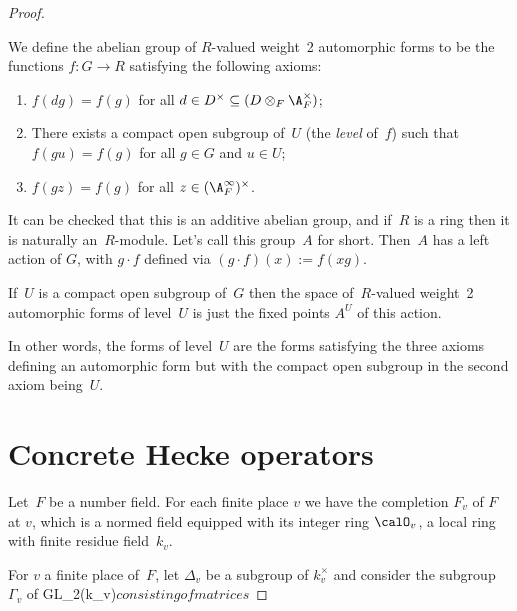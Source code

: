 \begin{proof}
\begin{definition}
  \label{TotallyDefiniteQuaternionAlgebra.WeightTwoAutomorphicForm}
  \leanok
  We define the abelian group of $R$-valued weight~2 automorphic forms
to be the functions $f:G\to R$ satisfying the following axioms:
\begin{enumerate}
  \item $f(dg)=f(g)$ for all $d\in D^\times\subseteq(D\otimes_F\A_F^\times)$;
  \item There exists a compact open subgroup of~$U$ (the \emph{level} of~$f$)
    such that $f(gu)=f(g)$ for all $g\in G$ and $u\in U$;
  \item $f(gz)=f(g)$ for all $z\in(\A_F^\infty)^\times$.
\end{enumerate}
\end{definition}

It can be checked that this is an additive abelian group, and if~$R$ is a ring
then it is naturally an~$R$-module. Let's call this group~$A$ for short.
Then~$A$ has a left action of $G$, with $g\cdot f$
defined via $(g\cdot f)(x):=f(xg)$.

\begin{definition}
  \label{TotallyDefiniteQuaternionAlgebra.WeightTwoAutomorphicFormOfLevel}
  \leanok
  If~$U$ is a compact open subgroup of~$G$ then the space of~$R$-valued weight~2
  automorphic forms of level~$U$ is just the fixed points $A^U$ of this action.
\end{definition}

In other words, the forms of level~$U$ are the forms satisfying the three axioms
defining an automorphic form but with the compact open subgroup in the second
axiom being~$U$.

\section{Concrete Hecke operators}

Let~$F$ be a number field. For each finite place $v$ we have the completion $F_v$ of $F$ at $v$,
which is a normed field equipped with its integer ring $\calO_v$, a local ring with
finite residue field~$k_v$.

For $v$ a finite place of~$F$, let $\Delta_v$ be a subgroup of $k_v^\times$ and consider
the subgroup $\Gamma_v$ of GL_2(k_v)$ consisting of matrices $
\end{proof}
